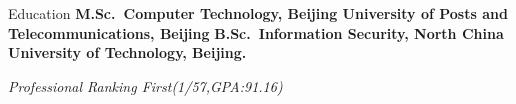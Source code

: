 \begin{rubric}{Education}
\entry*[\textbf{2016.9 -- 2019.6}]%
	\textbf{M.Sc.~Computer Technology, Beijing University of Posts and Telecommunications, Beijing} %
\entry*[\textbf{2012.8 -- 2016.6}]%
	\textbf{B.Sc.~Information Security, North China University of Technology, Beijing.}\par
    \emph{Professional Ranking First(1/57,GPA:91.16)}%
\end{rubric}